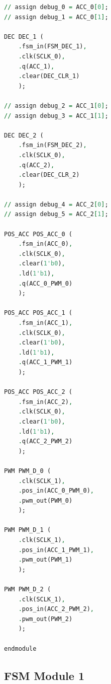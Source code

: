 \documentclass[
    a4paper, %
	12pt, %
    ]{CSSullivanBusinessReport}
\begin{document}
\begin{lstlisting}[language=VHDL]
// assign debug_0 = ACC_0[0];
// assign debug_1 = ACC_0[1];

DEC DEC_1 (
    .fsm_in(FSM_DEC_1),
    .clk(SCLK_0),
    .q(ACC_1),
    .clear(DEC_CLR_1)
    );

// assign debug_2 = ACC_1[0];
// assign debug_3 = ACC_1[1];

DEC DEC_2 (
    .fsm_in(FSM_DEC_2),
    .clk(SCLK_0),
    .q(ACC_2),
    .clear(DEC_CLR_2)
    );

// assign debug_4 = ACC_2[0];
// assign debug_5 = ACC_2[1];

POS_ACC POS_ACC_0 (
    .fsm_in(ACC_0),
    .clk(SCLK_0),
    .clear(1'b0),
    .ld(1'b1),
    .q(ACC_0_PWM_0)
    );

POS_ACC POS_ACC_1 (
    .fsm_in(ACC_1),
    .clk(SCLK_0),
    .clear(1'b0),
    .ld(1'b1),
    .q(ACC_1_PWM_1)
    );

POS_ACC POS_ACC_2 (
    .fsm_in(ACC_2),
    .clk(SCLK_0),
    .clear(1'b0),
    .ld(1'b1),
    .q(ACC_2_PWM_2)
    );

PWM PWM_D_0 (
    .clk(SCLK_1),
    .pos_in(ACC_0_PWM_0),
    .pwm_out(PWM_0)
    );

PWM PWM_D_1 (
    .clk(SCLK_1),
    .pos_in(ACC_1_PWM_1),
    .pwm_out(PWM_1)
    );

PWM PWM_D_2 (
    .clk(SCLK_1),
    .pos_in(ACC_2_PWM_2),
    .pwm_out(PWM_2)
    );
    
endmodule
\end{lstlisting}

\newpage

\subsection{FSM Module 1}
\end{document}
